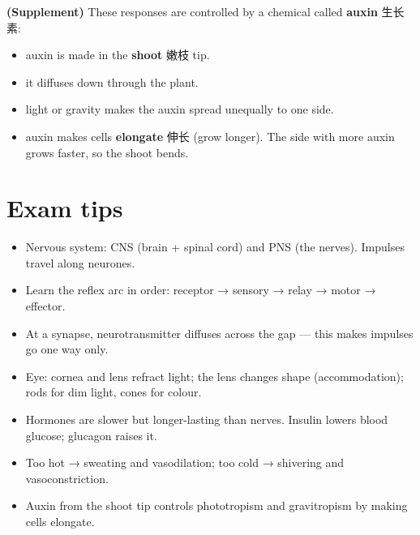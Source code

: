 \documentclass[11pt]{article}
\begin{document}
\textbf{(Supplement)} These responses are controlled by a chemical called \textbf{auxin} 生长素:

\begin{itemize}
\item auxin is made in the \textbf{shoot} 嫩枝 tip.

\item it diffuses down through the plant.

\item light or gravity makes the auxin spread unequally to one side.

\item auxin makes cells \textbf{elongate} 伸长 (grow longer). The side with more auxin grows faster, so the shoot bends.

\end{itemize}

\section*{Exam tips}

\begin{itemize}
\item Nervous system: CNS (brain + spinal cord) and PNS (the nerves). Impulses travel along neurones.

\item Learn the reflex arc in order: receptor → sensory → relay → motor → effector.

\item At a synapse, neurotransmitter diffuses across the gap — this makes impulses go one way only.

\item Eye: cornea and lens refract light; the lens changes shape (accommodation); rods for dim light, cones for colour.

\item Hormones are slower but longer-lasting than nerves. Insulin lowers blood glucose; glucagon raises it.

\item Too hot → sweating and vasodilation; too cold → shivering and vasoconstriction.

\item Auxin from the shoot tip controls phototropism and gravitropism by making cells elongate.

\end{itemize}
\end{document}
